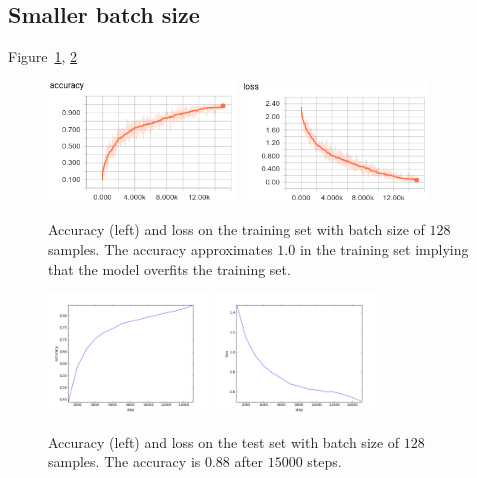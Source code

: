 \documentclass{article}
\begin{document}
\subsection{Smaller batch size}

Figure~\ref{fig:3}, \ref{fig:4}

\begin{figure}[h!]
\centering
\includegraphics[height=3.2cm]{acc3.png}\	
\includegraphics[height=3.2cm]{loss3.png}
\caption{Accuracy (left) and loss on the training set with batch size of $128$ samples. The accuracy approximates $1.0$ in the training set implying that the model overfits the training set.}
\label{fig:3}
\end{figure}


\begin{figure}[h!]
\centering
\includegraphics[height=3.2cm]{acc4.png}\	
\includegraphics[height=3.2cm]{loss4.png}
\caption{Accuracy (left) and loss on the test set with batch size of $128$ samples. The accuracy is $0.88$ after $15000$ steps.}
\label{fig:4}
\end{figure}
\end{document}
